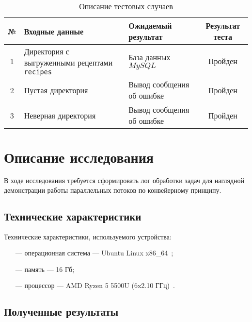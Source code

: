 \begin{table}[h!]
    \begin{center}
		\begin{threeparttable}
    \caption{Описание тестовых случаев}
    \captionsetup{justification=raggedright, singlelinecheck=false}
    \label{tbl:tests}
    \begin{tabular}{|c|p{6cm}|p{6cm}|c|}
        \hline
        \textbf{№} & \textbf{Входные данные} & \textbf{Ожидаемый результат} & \textbf{Результат теста} \\
        \hline
        1 & Директория с выгруженными рецептами \texttt{recipes} & База данных $MySQL$  & Пройден \\
        \hline
        2 & Пустая директория & Вывод сообщения об ошибке & Пройден \\
        \hline
        3 & Неверная директория & Вывод сообщения об ошибке & Пройден \\
        \hline
    \end{tabular}
    \end{threeparttable}
    \end{center}
\end{table}



\chapter{Описание исследования}
В ходе исследования требуется сформировать лог обработки задач для наглядной демонстрации работы параллельных потоков по конвейерному принципу. 

\section{Технические характеристики}
Технические характеристики, используемого устройства:
\begin{itemize}
    \item[---] операционная система --- Ubuntu Linux x86\_64~\cite{Ubuntu};
    \item[---] память --- 16 Гб;
    \item[---] процессор --- AMD Ryzen 5 5500U (6x2.10 ГГц)~\cite{AMD}.
\end{itemize}

\section{Полученные результаты}


